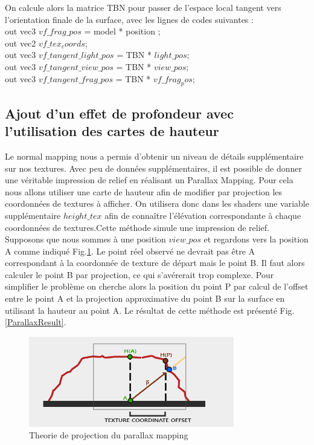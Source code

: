 \documentclass[a4paper]{article}
\begin{document}
On calcule  alors la matrice TBN pour passer de l'espace local tangent vers l'orientation finale de la surface, avec les lignes de codes suivantes :\\ 
out vec3 $vf\_frag\_pos$ = model * position ;\\
out vec2 $vf\_tex_coords$;\\
out vec3 $vf\_tangent\_light\_pos$ = TBN * $light\_pos$;\\
out vec3 $vf\_tangent\_view\_pos$ = TBN * $view\_pos$;\\
out vec3 $vf\_tangent\_frag\_pos$ = TBN * $vf\_frag_pos$;\\




\subsection{Ajout d'un effet de profondeur avec l'utilisation des cartes de hauteur}
Le normal mapping nous a permis d'obtenir un niveau de détails supplémentaire sur nos textures. Avec peu de données supplémentaires, il est possible de donner une véritable impression de relief en réalisant un Parallax Mapping. Pour cela nous allons utiliser une carte de hauteur afin de modifier par projection les coordonnées de textures à afficher. On utilisera donc dans les shaders une variable supplémentaire $height\_tex$ afin de connaître l'élévation correspondante à chaque coordonnées de textures.Cette méthode simule une impression de relief. \\

Supposons que nous sommes à une position $view\_pos$ et regardons vers la position A comme indiqué Fig.\ref{parallaxtheory}. Le point réel observé ne devrait pas être A correspondant à la coordonnée de texture de départ mais le point B. Il faut alors calculer le point B par projection, ce qui s’avérerait trop complexe. Pour simplifier le problème on cherche alors la position du point P par calcul de l'offset entre le point A  et la projection approximative du point B sur la surface en utilisant la hauteur au point A. Le résultat de cette méthode est présenté Fig.\ref{ParallaxResult}.


\begin{figure}[H]
\centering
\includegraphics[width=0.8\textwidth]{figures/parala.png}
\caption{Theorie de projection du parallax mapping}
\label{parallaxtheory}
\end{figure}
\end{document}
